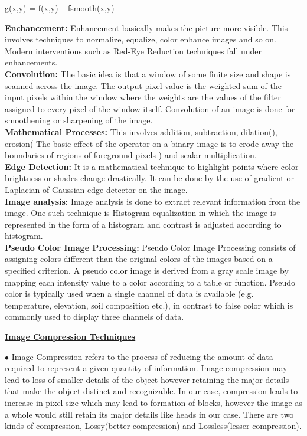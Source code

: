 \documentclass[10pt,a4paper]{article}
\begin{document}
\begin{center}
  g(x,y) = f(x,y) – fsmooth(x,y)\\
\end{center}
\textbf{Enchancement:}
Enhancement basically makes the picture more visible. This involves techniques to normalize, equalize, color enhance images and so on. Modern interventions such as Red-Eye Reduction techniques fall under enhancements.\\
\textbf{Convolution:}
The basic idea is that a window of some finite size and shape is scanned across the image. The output pixel value is the weighted sum of the input pixels within the window where the weights are the values of the filter assigned to every pixel of the window itself.  Convolution of an image is done for smoothening or sharpening of the image.\\
\textbf{Mathematical Processes:}
This involves addition, subtraction, dilation(), erosion( The basic effect of the operator on a binary image is to erode away the boundaries of regions of foreground pixels ) and scalar multiplication.\\
\textbf{Edge Detection:}
It is a mathematical technique to highlight points where color brightness or shades change drastically. It can be done by the use of gradient or Laplacian of Gaussian edge detector on the image.\\
\textbf{Image analysis:}
Image analysis is done to extract relevant information from the image. One such technique is Histogram equalization in which the image is represented in the form of a histogram and contrast is adjusted according to histogram.\\
\textbf{Pseudo Color Image Processing:}
Pseudo Color Image Processing consists of assigning colors diﬀerent than the original colors of the images based on a speciﬁed criterion. A pseudo color image is derived from a gray scale image by mapping each intensity value to a color according to a table or function. Pseudo color is typically used when a single channel of data is available (e.g. temperature, elevation, soil composition etc.), in contrast to false color which is commonly used to display three channels of data.
\begin{center}
\underline{\textbf{Image Compression Techniques}} 
\end{center}
$\bullet$ Image Compression refers to the process of reducing the amount of data required to represent a given quantity of information. Image compression may lead to loss of smaller details of the object however retaining the major details that make the object distinct and recognizable. In our case, compression leads to increase in pixel size which may lead to formation of blocks, however the image as a whole would still retain its major details like heads in our case. There are two kinds of compression, Lossy(better compression)  and Lossless(lesser compression).
\end{document}
